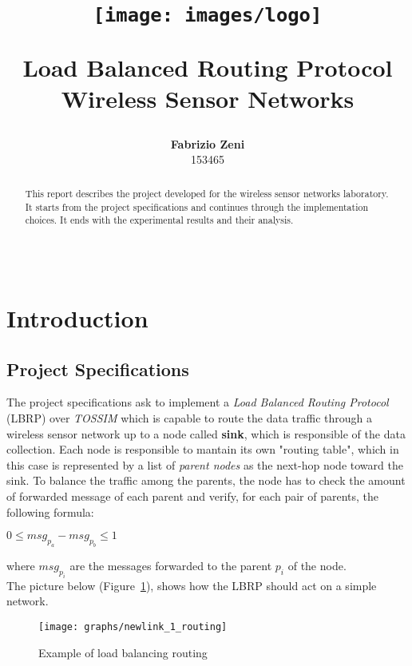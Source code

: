 \documentclass{article}
\title{
     \begin{figure}[ht]
       \centering
       \texttt{[image: images/logo]}
     \end{figure}
\vspace{1in}
\textmd{\textbf{Load Balanced Routing Protocol}}\\
\textmd{\normalsize{Wireless Sensor Networks}}\\
\vspace{3in}
}
\author{\textbf{Fabrizio Zeni} \\ \small{153465}}
\date{} %
\begin{document}
\maketitle %
\thispagestyle{empty}
\begin{center}
\begin{tabular}{l r}
\end{tabular}
\end{center}
\clearpage
\thispagestyle{empty}
\begin{abstract}
This report describes the project developed for the wireless sensor networks laboratory.
It starts from the project specifications and continues through the implementation choices.
It ends with the experimental results and their analysis.
\end{abstract}
\tableofcontents
\clearpage
\bigskip
\bigskip
\bigskip
\section{Introduction}
\subsection{Project Specifications}
\label{sec:projspec}
The project specifications ask to implement a \emph{Load Balanced Routing Protocol} (LBRP) over \textit{TOSSIM} which is capable to route the data traffic through a wireless sensor network up to a node called \textbf{sink}, which is responsible of the data collection.
Each node is responsible to mantain its own "routing table", which in this case is represented by a list of \emph{parent nodes} as the next-hop node toward the sink. To balance the traffic among the parents, the node has to check the amount of forwarded message of each parent and verify, for each pair of parents, the following formula: \begin{center}$0 \leq msg_{p_{a}} - msg_{p_{b}} \leq 1$\end{center}
where $msg_{p_{i}}$ are the messages forwarded to the parent $p_{i}$ of the node.
\\The picture below (Figure~\ref{fig:LBRPexample}), shows how the LBRP should act on a simple network.
		\begin{figure}[H]
			\begin{center}
				\texttt{[image: graphs/newlink\_1\_routing]}
				\caption{Example of load balancing routing}
				\label{fig:LBRPexample}
			\end{center}
		\end{figure}
\clearpage
\end{document}

